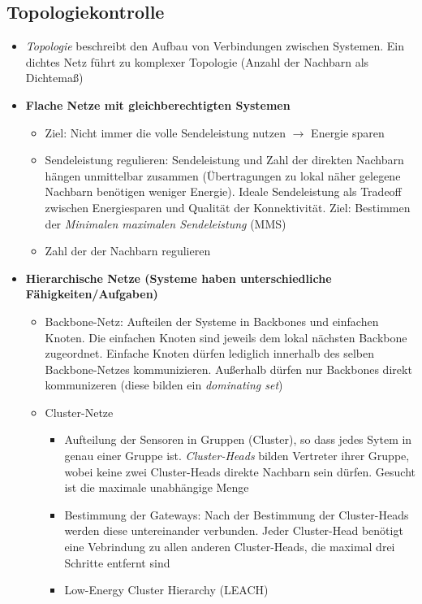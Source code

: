 \subsection{Topologiekontrolle}
\begin{itemize}
	\item \textit{Topologie} beschreibt den Aufbau von Verbindungen zwischen Systemen. Ein dichtes Netz führt zu komplexer Topologie (Anzahl der Nachbarn als Dichtemaß)
	\item \textbf{Flache Netze mit gleichberechtigten Systemen}
	\begin{itemize}
		\item Ziel: Nicht immer die volle Sendeleistung nutzen \(\rightarrow\) Energie sparen
		\item Sendeleistung regulieren: Sendeleistung und Zahl der direkten Nachbarn hängen unmittelbar zusammen (Übertragungen zu lokal näher gelegene Nachbarn benötigen weniger Energie). Ideale Sendeleistung als Tradeoff zwischen Energiesparen und Qualität der Konnektivität. Ziel: Bestimmen der \textit{Minimalen maximalen Sendeleistung} (MMS)
		\item Zahl der der Nachbarn regulieren
	\end{itemize}
	\item \textbf{Hierarchische Netze (Systeme haben unterschiedliche Fähigkeiten/Aufgaben)}
	\begin{itemize}
		\item Backbone-Netz: Aufteilen der Systeme in Backbones und einfachen Knoten. Die einfachen Knoten sind jeweils dem lokal nächsten Backbone zugeordnet. Einfache Knoten dürfen lediglich innerhalb des selben Backbone-Netzes kommunizieren. Außerhalb dürfen nur Backbones direkt kommunizeren (diese bilden ein \textit{dominating set})
		\item Cluster-Netze
		\begin{itemize}
			\item Aufteilung der Sensoren in Gruppen (Cluster), so dass jedes Sytem in genau einer Gruppe ist. \textit{Cluster-Heads} bilden Vertreter ihrer Gruppe, wobei keine zwei Cluster-Heads direkte Nachbarn sein dürfen. Gesucht ist die maximale unabhängige Menge
			\item Bestimmung der Gateways: Nach der Bestimmung der Cluster-Heads werden diese untereinander verbunden. Jeder Cluster-Head benötigt eine Vebrindung zu allen anderen Cluster-Heads, die maximal drei Schritte entfernt sind
			\item Low-Energy Cluster Hierarchy (LEACH)
			\begin{itemize}

\end{itemize}
\end{itemize}
\end{itemize}
\end{itemize}
